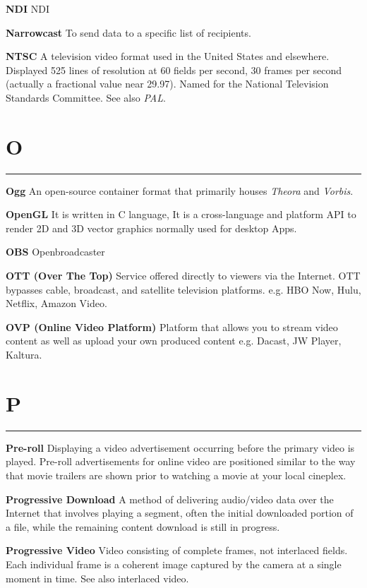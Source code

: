 \medskip
\textbf{NDI}
NDI

\smallskip
\textbf{Narrowcast}
To send data to a specific list of recipients.

\smallskip
\textbf{NTSC}
A television video format used in the United States and elsewhere. Displayed 525 lines of resolution at 60 fields per second, 30 frames per second (actually a fractional value near 29.97). Named for the National Television Standards Committee. See also \textit{PAL}.


\section{O}
\hrule

\medskip
\textbf{Ogg}
An open-source container format that primarily houses \textit{Theora} and \textit{Vorbis}.

\smallskip
\textbf{OpenGL}
It is written in C language, It is a cross-language and platform API to render 2D and 3D vector graphics normally used for desktop Apps.

\smallskip
\textbf{OBS}
Openbroadcaster

\smallskip
\textbf{OTT (Over The Top)}
Service offered directly to viewers via the Internet. OTT bypasses cable, broadcast, and satellite television platforms. e.g. HBO Now, Hulu, Netflix, Amazon Video.

\smallskip
\textbf{OVP (Online Video Platform)}
Platform that allows you to stream video content as well as upload your own produced content e.g. Dacast, JW Player, Kaltura.


\section{P}
\hrule



\medskip
\textbf{Pre-roll}
Displaying a video advertisement occurring before the primary video is played. Pre-roll advertisements for online video are positioned similar to the way that movie trailers are shown prior to watching a movie at your local cineplex.


\smallskip
\textbf{Progressive Download}
A method of delivering audio/video data over the Internet that involves playing a segment, often the initial downloaded portion of a file, while the remaining content download is still in progress.

\smallskip
\textbf{Progressive Video}
Video consisting of complete frames, not interlaced fields. Each individual frame is a coherent image captured by the camera at a single moment in time. See also interlaced video.

